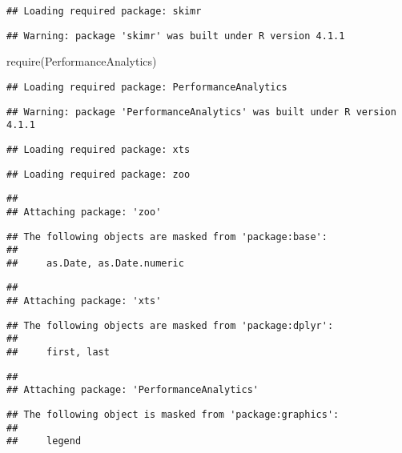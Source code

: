 \documentclass[
]{article}
\newenvironment{Shaded}{\begin{snugshade}}{\end{snugshade}}
\newcommand{\FunctionTok}[1]{\textcolor[rgb]{0.00,0.00,0.00}{#1}}
\newcommand{\NormalTok}[1]{#1}
\begin{document}
\begin{verbatim}
## Loading required package: skimr
\end{verbatim}

\begin{verbatim}
## Warning: package 'skimr' was built under R version 4.1.1
\end{verbatim}

\begin{Shaded}
\begin{Highlighting}[]
\FunctionTok{require}\NormalTok{(PerformanceAnalytics)}
\end{Highlighting}
\end{Shaded}

\begin{verbatim}
## Loading required package: PerformanceAnalytics
\end{verbatim}

\begin{verbatim}
## Warning: package 'PerformanceAnalytics' was built under R version 4.1.1
\end{verbatim}

\begin{verbatim}
## Loading required package: xts
\end{verbatim}

\begin{verbatim}
## Loading required package: zoo
\end{verbatim}

\begin{verbatim}
## 
## Attaching package: 'zoo'
\end{verbatim}

\begin{verbatim}
## The following objects are masked from 'package:base':
## 
##     as.Date, as.Date.numeric
\end{verbatim}

\begin{verbatim}
## 
## Attaching package: 'xts'
\end{verbatim}

\begin{verbatim}
## The following objects are masked from 'package:dplyr':
## 
##     first, last
\end{verbatim}

\begin{verbatim}
## 
## Attaching package: 'PerformanceAnalytics'
\end{verbatim}

\begin{verbatim}
## The following object is masked from 'package:graphics':
## 
##     legend
\end{verbatim}
\end{document}
